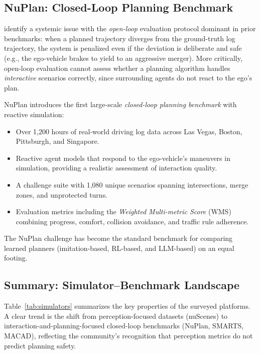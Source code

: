 \documentclass[12pt, a4paper]{article}
\begin{document}
\subsection{NuPlan: Closed-Loop Planning Benchmark}

\citet{caesar2021nuplan} identify a systemic issue with the \emph{open-loop}
evaluation protocol dominant in prior benchmarks: when a planned trajectory
diverges from the ground-truth log trajectory, the system is penalized even if
the deviation is deliberate and safe (e.g., the ego-vehicle brakes to yield to an
aggressive merger). More critically, open-loop evaluation cannot assess whether
a planning algorithm handles \emph{interactive} scenarios correctly, since
surrounding agents do not react to the ego's plan.

NuPlan introduces the first large-scale \emph{closed-loop planning benchmark}
with reactive simulation:
\begin{itemize}[noitemsep]
  \item Over 1,200 hours of real-world driving log data across Las Vegas, Boston,
        Pittsburgh, and Singapore.
  \item Reactive agent models that respond to the ego-vehicle's maneuvers in
        simulation, providing a realistic assessment of interaction quality.
  \item A challenge suite with 1,080 unique scenarios spanning intersections,
        merge zones, and unprotected turns.
  \item Evaluation metrics including the \emph{Weighted Multi-metric Score} (WMS)
        combining progress, comfort, collision avoidance, and traffic rule
        adherence.
\end{itemize}
The NuPlan challenge has become the standard benchmark for comparing learned
planners (imitation-based, RL-based, and LLM-based) on an equal footing.

\subsection{Summary: Simulator--Benchmark Landscape}

Table~\ref{tab:simulators} summarizes the key properties of the surveyed platforms.
A clear trend is the shift from perception-focused datasets (nuScenes) to
interaction-and-planning-focused closed-loop benchmarks (NuPlan, SMARTS, MACAD),
reflecting the community's recognition that perception metrics do not predict
planning safety.
\end{document}
